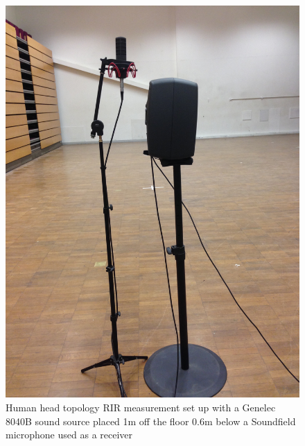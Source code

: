 \documentclass[../../main.tex]{subfiles}
\begin{document}
		\begin{figure}[H]
			\begin{center}
				\includegraphics[scale = 0.06]{Sections/Implementation/RealRIRs/images/realRIRTopology1.jpg} 
				\caption{Human head topology \ac{RIR} measurement set up with a Genelec 8040B sound source placed 1m off the floor 0.6m below a Soundfield microphone used as a receiver}
				\label{realRIRTop}
			\end{center}
		\end{figure}
\end{document}
